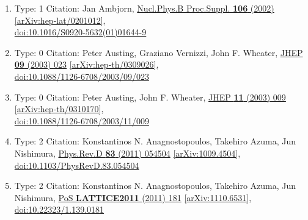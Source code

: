 \documentclass[a4paper,10pt]{article}
\begin{document}
\begin{enumerate}
\begin{enumerate}
  \item Type: 1 Citation: Jan Ambjorn, \href{https://www.doi.org/10.1016/S0920-5632(01)01644-9}{Nucl.Phys.B Proc.Suppl. {\bf 106} (2002) }  \href{https://arxiv.org/abs/hep-lat/0201012}{[arXiv:hep-lat/0201012]},\\\href{https://www.doi.org/10.1016/S0920-5632(01)01644-9}{doi:10.1016/S0920-5632(01)01644-9}
  \item Type: 0 Citation: Peter Austing, Graziano Vernizzi, John F. Wheater, \href{https://www.doi.org/10.1088/1126-6708/2003/09/023}{JHEP {\bf 09} (2003) 023}  \href{https://arxiv.org/abs/hep-th/0309026}{[arXiv:hep-th/0309026]},\\\href{https://www.doi.org/10.1088/1126-6708/2003/09/023}{doi:10.1088/1126-6708/2003/09/023}
  \item Type: 0 Citation: Peter Austing, John F. Wheater, \href{https://www.doi.org/10.1088/1126-6708/2003/11/009}{JHEP {\bf 11} (2003) 009}  \href{https://arxiv.org/abs/hep-th/0310170}{[arXiv:hep-th/0310170]},\\\href{https://www.doi.org/10.1088/1126-6708/2003/11/009}{doi:10.1088/1126-6708/2003/11/009}
  \item Type: 2 Citation: Konstantinos N. Anagnostopoulos, Takehiro Azuma, Jun Nishimura, \href{https://www.doi.org/10.1103/PhysRevD.83.054504}{Phys.Rev.D {\bf 83} (2011) 054504}  \href{https://arxiv.org/abs/1009.4504}{[arXiv:1009.4504]},\\\href{https://www.doi.org/10.1103/PhysRevD.83.054504}{doi:10.1103/PhysRevD.83.054504}
  \item Type: 2 Citation: Konstantinos N. Anagnostopoulos, Takehiro Azuma, Jun Nishimura, \href{https://www.doi.org/10.22323/1.139.0181}{PoS {\bf LATTICE2011} (2011) 181}  \href{https://arxiv.org/abs/1110.6531}{[arXiv:1110.6531]},\\\href{https://www.doi.org/10.22323/1.139.0181}{doi:10.22323/1.139.0181}

\end{enumerate}
\end{enumerate}
\end{document}
